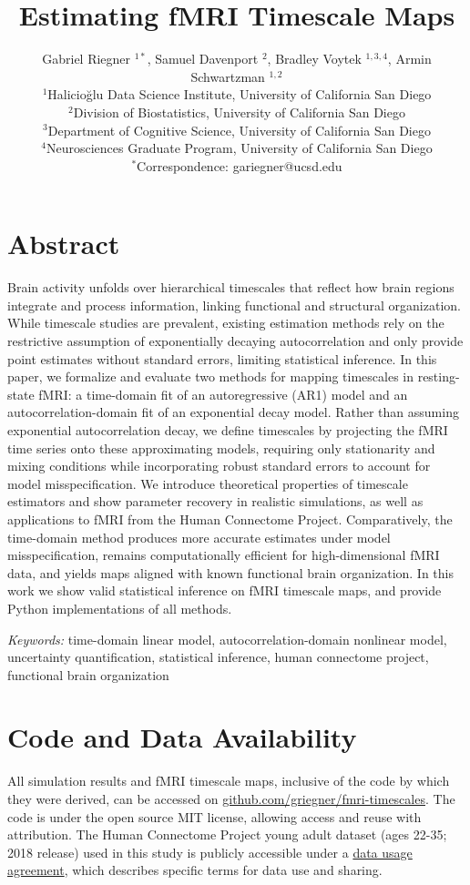 \documentclass[9pt]{article}
\title{Estimating fMRI Timescale Maps}
\author{Gabriel Riegner $^{1\ast}$, Samuel Davenport $^{2}$, Bradley Voytek $^{1,3,4}$, Armin Schwartzman $^{1,2}$\\
{\small $^{1}$Halicio\u{g}lu Data Science Institute, University of California San Diego}\\
{\small $^{2}$Division of Biostatistics, University of California San Diego}\\
{\small $^{3}$Department of Cognitive Science, University of California San Diego}\\
{\small $^{4}$Neurosciences Graduate Program, University of California San Diego}\\
{\small $^\ast$Correspondence:  gariegner@ucsd.edu}
}
\date{}
\begin{document}
\maketitle

\section*{Abstract}
Brain activity unfolds over hierarchical timescales that reflect how brain regions integrate and process information, linking functional and structural organization. While timescale studies are prevalent, existing estimation methods rely on the restrictive assumption of exponentially decaying autocorrelation and only provide point estimates without standard errors, limiting statistical inference. In this paper, we formalize and evaluate two methods for mapping timescales in resting-state fMRI: a time-domain fit of an autoregressive (AR1) model and an autocorrelation-domain fit of an exponential decay model. Rather than assuming exponential autocorrelation decay, we define timescales by projecting the fMRI time series onto these approximating models, requiring only stationarity and mixing conditions while incorporating robust standard errors to account for model misspecification. We introduce theoretical properties of timescale estimators and show parameter recovery in realistic simulations, as well as applications to fMRI from the Human Connectome Project. Comparatively, the time-domain method produces more accurate estimates under model misspecification, remains computationally efficient for high-dimensional fMRI data, and yields maps aligned with known functional brain organization. In this work we show valid statistical inference on fMRI timescale maps, and provide Python implementations of all methods.

\vfill
\noindent\textit{Keywords:} time-domain linear model, autocorrelation-domain nonlinear model, uncertainty quantification, statistical inference, human connectome project, functional brain organization
\thispagestyle{empty}
\newpage
\setcounter{page}{1}







\section*{Code and Data Availability}
All simulation results and fMRI timescale maps, inclusive of the code by which they were derived, can be accessed on \href{https://github.com/griegner/fmri-timescales}{github.com/griegner/fmri-timescales}. The code is under the open source MIT license, allowing access and reuse with attribution. The Human Connectome Project young adult dataset (ages 22-35; 2018 release) used in this study is publicly accessible under a \href{https://www.humanconnectome.org/storage/app/media/data_use_terms/DataUseTerms-HCP-Open-Access-26Apr2013.pdf}{data usage agreement}, which describes specific terms for data use and sharing.
\end{document}
